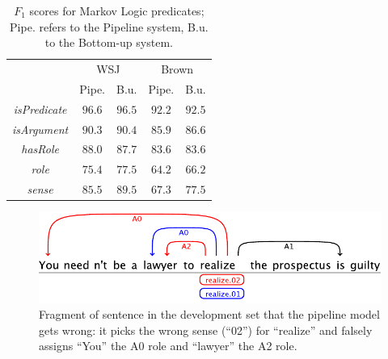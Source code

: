 \begin{table}[ht]

    \centering
    \begin{tabular}{|c|c|c|c|c|}\hline
      & \multicolumn{2}{c|}{WSJ} & \multicolumn{2}{c|}{Brown}\\
                                  & Pipe.  &  B.u.   & Pipe.  &  B.u. \\\hline 
        \emph{isPredicate}        & $96.6$ & $96.5$ & $92.2$  & $92.5$\\
        \emph{isArgument}         & $90.3$ & $90.4$ & $85.9$ & $86.6$ \\
        \emph{hasRole}            & $88.0$ & $87.7$ & $83.6$ & $83.6$ \\
        \emph{role}               & $75.4$ & $77.5$ & $64.2$ & $66.2$ \\
        \emph{sense}              & $85.5$ & $89.5$ & $67.3$ & $77.5$ \\\hline
    \end{tabular}
    \caption{$F_1$ scores for Markov Logic predicates; Pipe. refers to the Pipeline system, B.u. to the Bottom-up system.}
    \label{tbl:predicates}
\end{table}

\begin{figure}
\begin{center}
    \includegraphics[scale=.58]{joint-sense-example}
\end{center}
\caption{Fragment of sentence in the development set that the pipeline model gets wrong: it picks the wrong sense (``02'') for ``realize'' and falsely assigns ``You'' the A0 role and ``lawyer'' the A2 role.}
\label{fig:jointSense}
\end{figure}



